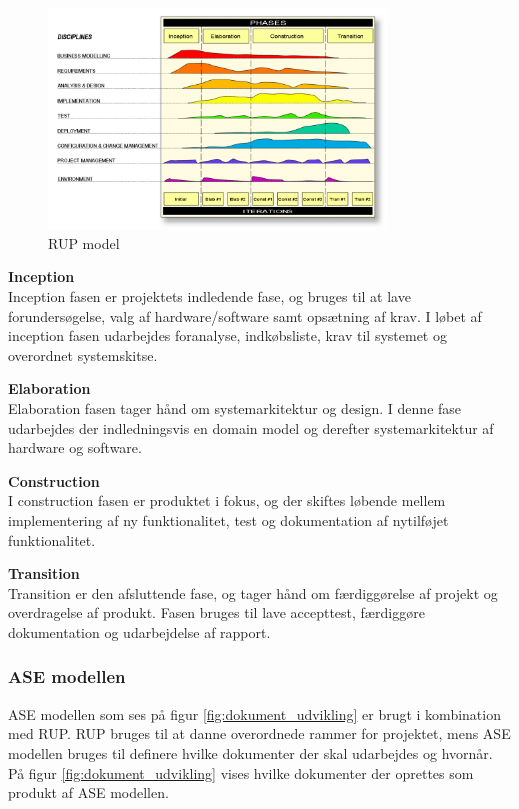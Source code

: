 \begin{figure}[H]
	\centering
	\includegraphics[width=0.80\textwidth]{Billeder/Udviklingsproces/RUP}
	\caption{RUP model}
	\label{fig:rup}
\end{figure}

\textbf{Inception}\\
Inception fasen er projektets indledende fase, og bruges til at lave forundersøgelse, valg af hardware/software samt opsætning af krav. I løbet af inception fasen udarbejdes foranalyse, indkøbsliste, krav til systemet og overordnet systemskitse. 

\textbf{Elaboration}\\
Elaboration fasen tager hånd om systemarkitektur og design. I denne fase udarbejdes der indledningsvis en domain model og derefter systemarkitektur af hardware og software. 

\textbf{Construction}\\
I construction fasen er produktet i fokus, og der skiftes løbende mellem implementering af ny funktionalitet, test og dokumentation af nytilføjet funktionalitet. 

\textbf{Transition}\\
Transition er den afsluttende fase, og tager hånd om færdiggørelse af projekt og overdragelse af produkt. Fasen bruges til lave accepttest, færdiggøre dokumentation og udarbejdelse af rapport. 

\newpage

\subsubsection*{ASE modellen}
ASE modellen som ses på figur \ref{fig:dokument_udvikling} er brugt i kombination med RUP. RUP bruges til at danne overordnede rammer for projektet, mens ASE modellen bruges til definere hvilke dokumenter der skal udarbejdes og hvornår. På figur \ref{fig:dokument_udvikling} vises hvilke dokumenter der oprettes som produkt af ASE modellen. 

